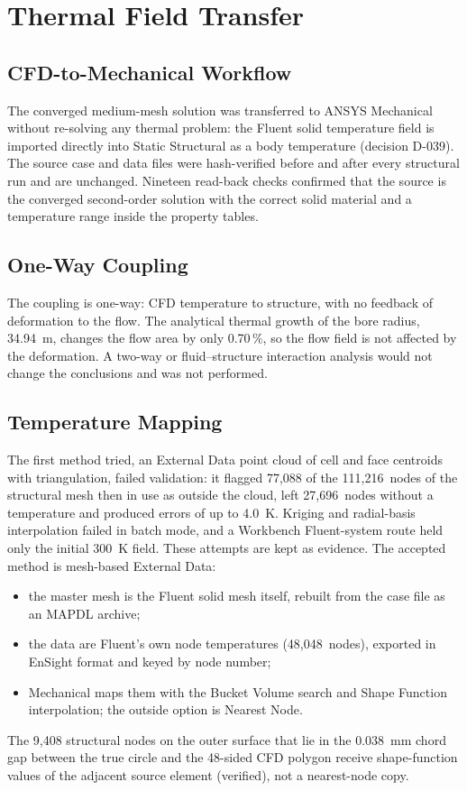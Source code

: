 \chapter{Thermal Field Transfer}\label{ch:mapping}

\section{CFD-to-Mechanical Workflow}
The converged medium-mesh solution was transferred to ANSYS Mechanical without re-solving any thermal problem: the Fluent solid temperature
field is imported directly into Static Structural as a body temperature (decision D-039). The source case and data files were hash-verified
before and after every structural run and are unchanged. Nineteen read-back checks confirmed that the source is the converged second-order
solution with the correct solid material and a temperature range inside the property tables.

\section{One-Way Coupling}
The coupling is one-way: CFD temperature to structure, with no feedback of deformation to the flow. The analytical thermal growth of the bore radius,
34.94~\textmu m, changes the flow area by only 0.70\,\%, so the flow field is not affected by the deformation. A two-way or fluid--structure interaction analysis would not change the conclusions and was not performed.

\section{Temperature Mapping}
The first method tried, an External Data point cloud of cell and face centroids with triangulation, failed validation: it flagged 77,088
of the 111,216~nodes of the structural mesh then in use as outside the cloud, left 27,696~nodes without a temperature and produced errors of up to 4.0~K. Kriging and
radial-basis interpolation failed in batch mode, and a Workbench Fluent-system route held only the initial 300~K field. These attempts are
kept as evidence. The accepted method is mesh-based External Data:
\begin{itemize}
\item the master mesh is the Fluent solid mesh itself, rebuilt from the case file as an MAPDL archive;
\item the data are Fluent's own node temperatures (48,048~nodes), exported in EnSight format and keyed by node number;
\item Mechanical maps them with the Bucket Volume search and Shape Function interpolation; the outside option is Nearest Node.
\end{itemize}
The 9,408 structural nodes on the outer surface that lie in the 0.038~mm chord gap between the true circle and the 48-sided CFD polygon
receive shape-function values of the adjacent source element (verified), not a nearest-node copy.

